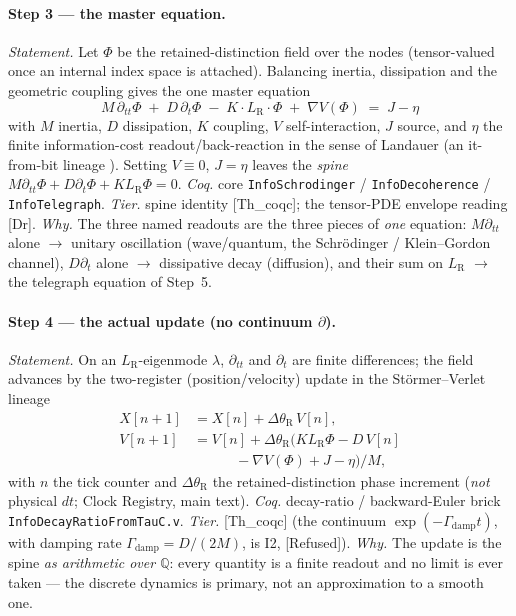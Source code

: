 \documentclass[10pt,twocolumn]{article}
\theoremstyle{definition}
\newcommand{\Thq}{\textsf{[Th\_coqc]}}   %
\newcommand{\Dr}{\textsf{[Dr]}}          %
\newcommand{\Refu}{\textsf{[Refused]}}    %
\newcommand{\code}[1]{\texttt{#1}}
\newcommand{\LR}{L_{\mathrm R}}
\newcommand{\dth}{\Delta\theta_{\mathrm R}}
\begin{document}
\paragraph{Step 3 --- the master equation.}
\emph{Statement.} Let $\Phi$ be the retained-distinction field over the nodes
(tensor-valued once an internal index space is attached). Balancing inertia,
dissipation and the geometric coupling gives the one master equation
\[
  \boxed{\,M\,\partial_{tt}\Phi \;+\; D\,\partial_t\Phi \;-\; K\!\cdot\!\LR\!\cdot\!\Phi
  \;+\; \nabla V(\Phi) \;=\; J-\eta\,}
\]
with $M$ inertia, $D$ dissipation, $K$ coupling, $V$ self-interaction, $J$
source, and $\eta$ the finite information-cost readout/back-reaction in the
sense of Landauer \cite{landauer1961} (an it-from-bit lineage \cite{wheeler1990}).
Setting $V\!\equiv\!0$, $J=\eta$ leaves
the \emph{spine} $M\partial_{tt}\Phi+D\partial_t\Phi+K\LR\Phi=0$.
\emph{Coq.} core \code{InfoSchrodinger} / \code{InfoDecoherence} /
\code{InfoTelegraph}. \emph{Tier.} spine identity \Thq{}; the tensor-PDE
envelope reading \Dr{}. \emph{Why.} The three named readouts are the three
pieces of \emph{one} equation: $M\partial_{tt}$ alone $\to$ unitary oscillation
(wave/quantum, the Schr\"odinger \cite{schrodinger1926} / Klein--Gordon
\cite{klein1926,gordon1926} channel), $D\partial_t$ alone $\to$ dissipative
decay (diffusion), and their sum on $\LR$ $\to$ the telegraph equation
\cite{thomson1855,heaviside1893} of Step~5.

\paragraph{Step 4 --- the actual update (no continuum $\partial$).}
\emph{Statement.} On an $\LR$-eigenmode $\lambda$, $\partial_{tt}$ and
$\partial_t$ are finite differences; the field advances by the two-register
(position/velocity) update in the St\"ormer--Verlet lineage
\cite{stormer1907,verlet1967}
\[
\begin{aligned}
  X[n+1] &= X[n] + \dth\,V[n],\\
  V[n+1] &= V[n] + \dth\big(K\LR\Phi - D\,V[n]\\
         &\qquad\quad {}- \nabla V(\Phi) + J-\eta\big)/M,
\end{aligned}
\]
with $n$ the tick counter and $\dth$ the retained-distinction phase increment
(\emph{not} physical $dt$; Clock Registry, main text). \emph{Coq.} decay-ratio /
backward-Euler brick \code{InfoDecayRatioFromTauC.v}. \emph{Tier.} \Thq{}
(the continuum $\exp(-\Gamma_{\mathrm{damp}} t)$, with damping rate $\Gamma_{\mathrm{damp}}=D/(2M)$, is I2, \Refu{}). \emph{Why.} The update is the
spine \emph{as arithmetic over $\mathbb{Q}$}: every quantity is a finite
readout and no limit is ever taken --- the discrete dynamics is primary, not an
approximation to a smooth one.
\end{document}
